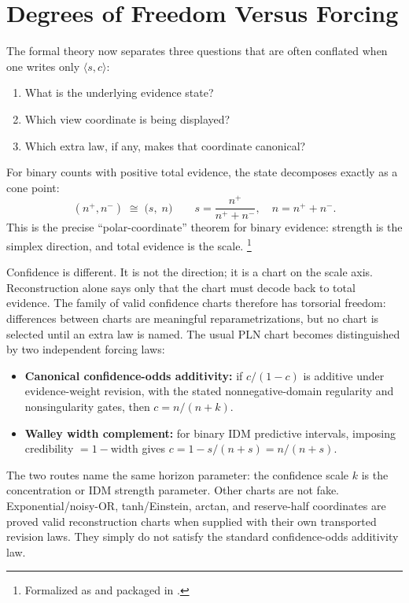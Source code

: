 \documentclass[11pt,openany]{report}
\begin{document}
\section{Degrees of Freedom Versus Forcing}
\label{sec:dof-forcing-views}

The formal theory now separates three questions that are often
conflated when one writes only $\langle s,c\rangle$:

\begin{enumerate}
\item What is the underlying evidence state?
\item Which view coordinate is being displayed?
\item Which extra law, if any, makes that coordinate canonical?
\end{enumerate}

\noindent
For binary counts with positive total evidence, the state decomposes
exactly as a cone point:
\[
(n^+,n^-)
\;\cong\;
\bigl(s,\; n\bigr)
\qquad
s=\frac{n^+}{n^+ + n^-},\quad n=n^+ + n^- .
\]
This is the precise ``polar-coordinate'' theorem for binary evidence:
strength is the simplex direction, and total evidence is the scale.%
\footnote{Formalized as
 and packaged in
.}

Confidence is different.  It is not the direction; it is a chart on the
scale axis.  Reconstruction alone says only that the chart must decode
back to total evidence.  The family of valid confidence charts therefore
has torsorial freedom: differences between charts are meaningful
reparametrizations, but no chart is selected until an extra law is named.
The usual PLN chart becomes distinguished by two independent forcing
laws:

\begin{itemize}
\item \textbf{Canonical confidence-odds additivity:}
  if $c/(1-c)$ is additive under evidence-weight revision, with the
  stated nonnegative-domain regularity and nonsingularity gates, then
  $c=n/(n+k)$.
\item \textbf{Walley width complement:}
  for binary IDM predictive intervals, imposing
  credibility $=1-\mathrm{width}$ gives
  $c = 1 - s/(n+s)=n/(n+s)$.
\end{itemize}

\noindent
The two routes name the same horizon parameter: the confidence scale
$k$ is the concentration or IDM strength parameter.  Other charts are
not fake.  Exponential/noisy-OR, tanh/Einstein, arctan, and reserve-half
coordinates are proved valid reconstruction charts when supplied with
their own transported revision laws.  They simply do not satisfy the
standard confidence-odds additivity law.
\end{document}
